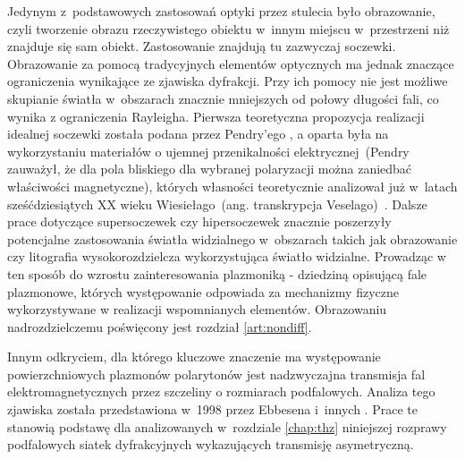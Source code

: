 
Jedynym z~podstawowych zastosowań optyki przez stulecia było obrazowanie, czyli tworzenie obrazu rzeczywistego obiektu w~innym miejscu w~przestrzeni niż znajduje się sam obiekt. Zastosowanie znajdują tu zazwyczaj soczewki. Obrazowanie za pomocą tradycyjnych elementów optycznych ma jednak znaczące ograniczenia wynikające ze zjawiska dyfrakcji. Przy ich pomocy nie jest możliwe skupianie światła w~obszarach znacznie mniejszych od połowy długości fali, co wynika z ograniczenia Rayleigha. Pierwsza teoretyczna propozycja realizacji idealnej soczewki została podana przez Pendry'ego \cite{PhysRevLett.85.3966,loschialpo2003electromagnetic,smith2003limitations,ramakrishna2002asymmetric}, a oparta była na wykorzystaniu materiałów o ujemnej przenikalności elektrycznej~(Pendry zauważył, że dla pola bliskiego dla wybranej polaryzacji można zaniedbać właściwości magnetyczne), których własności teoretycznie analizował już w~latach sześćdziesiątych XX wieku Wiesiełago~(ang. transkrypcja Veselago)~\cite{veselago1968electrodynamics}. Dalsze prace dotyczące supersoczewek czy hipersoczewek \cite{liu2007far,jacob2006optical,jacob2007semiclassical,ma2010advances,rho2010spherical} znacznie poszerzyły potencjalne zastosowania światła widzialnego w~obszarach takich jak obrazowanie czy litografia wysokorozdzielcza wykorzystująca światło widzialne. Prowadząc w ten sposób do wzrostu zainteresowania plazmoniką - dziedziną opisującą fale plazmonowe, których występowanie odpowiada za mechanizmy fizyczne wykorzystywane w realizacji wspomnianych elementów. Obrazowaniu nadrozdzielczemu poświęcony jest rozdział \ref{art:nondiff}.

Innym odkryciem, dla którego kluczowe znaczenie ma występowanie powierzchniowych plazmonów polarytonów jest nadzwyczajna transmisja fal elektromagnetycznych przez szczeliny o rozmiarach podfalowych. Analiza tego zjawiska została przedstawiona w~1998 przez Ebbesena i~innych \cite{ebbesen1998extraordinary}. Prace te stanowią podstawę dla analizowanych w~rozdziale \ref{chap:thz} niniejszej rozprawy podfalowych siatek dyfrakcyjnych wykazujących transmisję asymetryczną.

